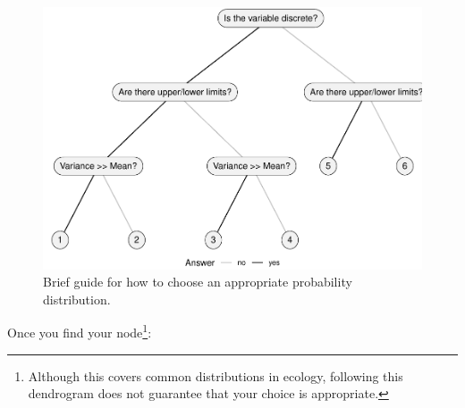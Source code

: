 \documentclass[
]{book}
\begin{document}
\begin{figure}

{\centering \includegraphics{_main_files/figure-latex/dendrogram-1} 

}

\caption{Brief guide for how to choose an appropriate probability distribution.}\label{fig:dendrogram}
\end{figure}

Once you find your node\footnote{Although this covers common distributions in ecology, following this dendrogram does not guarantee that your choice is appropriate.}:
\end{document}
